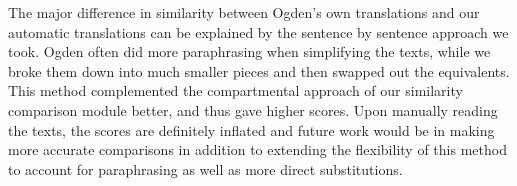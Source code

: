 \documentclass[11pt]{article}
\begin{document}
The major difference in similarity between Ogden’s own translations and our automatic translations can be explained by the sentence by sentence approach we took. Ogden often did more paraphrasing when simplifying the texts, while we broke them down into much smaller pieces and then swapped out the equivalents. This method complemented the compartmental approach of our similarity comparison module better, and thus gave higher scores. Upon manually reading the texts, the scores are definitely inflated and future work would be in making more accurate comparisons in addition to extending the flexibility of this method to account for paraphrasing as well as more direct substitutions. 


\vfill
\columnbreak
\nocite{*}


\end{document}
